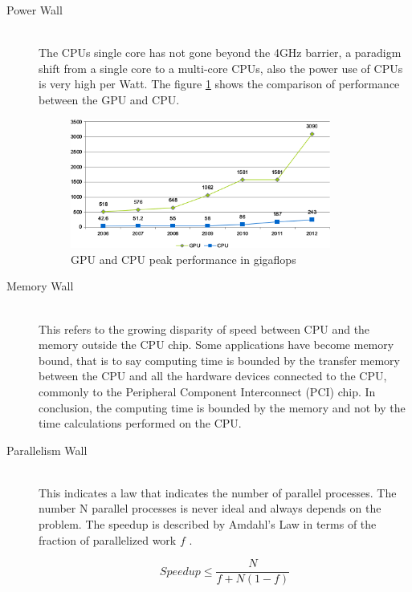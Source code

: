 \begin{description}
  \item[Power Wall] \hfill \\
  The CPUs single core has not gone beyond the 4GHz barrier, a paradigm shift from a single core to a multi-core CPUs, also  the power use of CPUs is very high per Watt. The figure \ref{fig:gpu_cpu_s} shows the comparison of performance between the GPU and CPU.

\begin{figure}[htbp]
	\centering
		\includegraphics[width=0.84\textwidth]{Figures/GPU_CPU_s.png}
		\smallskip
	\caption[GPU and CPU performance comparision]{GPU and CPU peak performance in gigaflops}
	\label{fig:gpu_cpu_s}
\end{figure}

  \item[Memory Wall] \hfill \\
  This refers to the growing disparity of speed between CPU  and the memory outside the CPU chip. Some applications have become memory bound, that is to say computing time is bounded by the transfer memory between the CPU and all the hardware devices connected to the CPU, commonly to the Peripheral Component Interconnect (PCI) chip. In conclusion, the computing time is bounded by the memory and not by the time calculations performed on the CPU.

  \item[Parallelism Wall] \hfill \\
  This indicates a law that indicates the number of parallel processes. The number N parallel processes is never ideal and always depends on the problem.  The speedup is described by Amdahl's Law in terms of the fraction of parallelized work $f$ \cite{quantitative}.

  $$Speedup \leq \frac{N}{f + N(1-f)}$$


\end{description}

